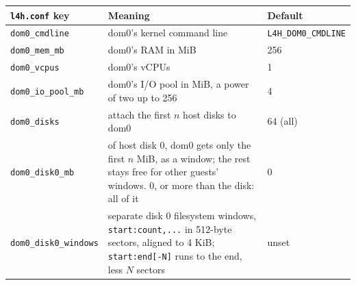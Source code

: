 \documentclass[11pt,a4paper]{report}
\newcommand{\file}[1]{\texttt{#1}}
\begin{document}
\begin{table}[ht]
\centering
\begin{tabularx}{\linewidth}{@{}lXl@{}}
\toprule
\file{l4h.conf} key & Meaning & Default \\
\midrule
\texttt{dom0\_cmdline} & dom0's kernel command line & \texttt{L4H\_DOM0\_CMDLINE} \\
\texttt{dom0\_mem\_mb} & dom0's RAM in MiB & 256 \\
\texttt{dom0\_vcpus} & dom0's vCPUs & 1 \\
\texttt{dom0\_io\_pool\_mb} & dom0's I/O pool in MiB, a power of two up to 256 & 4 \\
\texttt{dom0\_disks} & attach the first $n$ host disks to dom0 & 64 (all) \\
\texttt{dom0\_disk0\_mb} & of host disk 0, dom0 gets only the first $n$ MiB, as
  a window; the rest stays free for other guests' windows. 0, or more than
  the disk: all of it & 0 \\
\texttt{dom0\_disk0\_windows} & separate disk 0 filesystem windows,
\texttt{start:count,...} in 512-byte sectors, aligned to 4 KiB;
\texttt{start:end[-N]} runs to the end, less $N$ sectors & unset \\


\end{tabularx}
\end{table}
\end{document}
